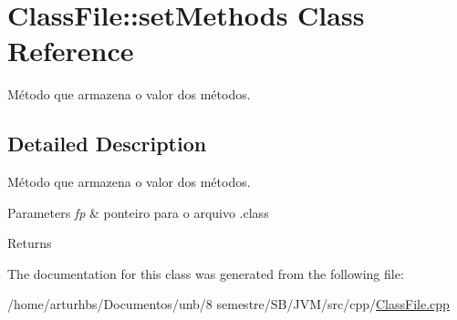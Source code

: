 \hypertarget{classClassFile_1_1setMethods}{}\section{Class\+File\+:\+:set\+Methods Class Reference}
\label{classClassFile_1_1setMethods}


Método que armazena o valor dos métodos.  




\subsection{Detailed Description}
Método que armazena o valor dos métodos. 


\begin{DoxyParams}{Parameters}
{\em fp} & ponteiro para o arquivo .class \\
\hline
\end{DoxyParams}
\begin{DoxyReturn}{Returns}

\end{DoxyReturn}


The documentation for this class was generated from the following file\+:\begin{DoxyCompactItemize}
\item 
/home/arturhbs/\+Documentos/unb/8 semestre/\+S\+B/\+J\+V\+M/src/cpp/\hyperlink{ClassFile_8cpp}{Class\+File.\+cpp}\end{DoxyCompactItemize}
